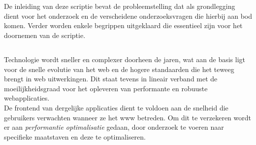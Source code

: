
%
%

\chapter{}
\label{ch:inleiding}

De inleiding van deze scriptie bevat de probleemstelling dat als grondlegging dient voor het onderzoek en de verscheidene onderzoeksvragen die hierbij aan bod komen. Verder worden enkele begrippen uitgeklaard die essentieel zijn voor het doornemen van de scriptie.\\

\section{}
\label{sec:context}

Technologie wordt sneller en complexer doorheen de jaren, wat aan de basis ligt voor de snelle evolutie van het web en de hogere standaarden die het teweeg brengt in web uitwerkingen. Dit staat tevens in lineair verband met de moeilijkheidsgraad voor het opleveren van performante en robuuste webapplicaties. \\
De frontend van dergelijke applicaties dient te voldoen aan de snelheid die gebruikers verwachten wanneer ze het \gls{www} betreden. Om dit te verzekeren wordt er aan \emph{performantie optimalisatie} gedaan, door onderzoek te voeren naar specifieke maatstaven en deze te optimaliseren.

\subsection{}
\label{sec:performantie}

